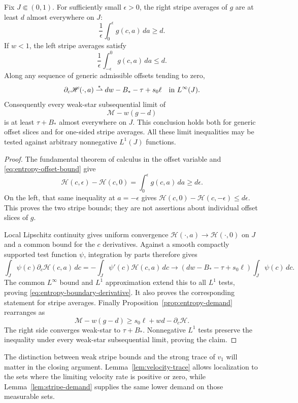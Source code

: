 \begin{lemma}
\label{lem:stripe-demand}
Fix $J\Subset(0,1)$.  For sufficiently small $\epsilon>0$, the right
stripe averages of $g$ are at least $d$ almost everywhere on $J$:
\begin{equation}
 \frac1\epsilon\int_0^\epsilon g(c,a)\,da\ge d.
 \label{eq:entropy-right-stripe}
\end{equation}
If $w<1$, the left stripe averages satisfy
\begin{equation}
 \frac1\epsilon\int_{-\epsilon}^0g(c,a)\,da\le d.
 \label{eq:entropy-left-stripe}
\end{equation}
Along any sequence of generic admissible offsets tending to zero,
\begin{equation}
 \partial_c\mathscr H(\cdot,a)
    \overset{*}{\rightharpoonup}dw-B_*-\tau+s_0\ell
           \quad\hbox{in }L^\infty(J).
 \label{eq:entropy-boundary-derivative}
\end{equation}
Consequently every weak-star subsequential limit of
\begin{equation}
 \mathcal M-w(g-d)
 \label{eq:entropy-adjusted-demand}
\end{equation}
is at least $\tau+B_*$ almost everywhere on $J$.  This conclusion
holds both for generic offset slices and for one-sided stripe averages.
All these limit inequalities may be tested against arbitrary
nonnegative $L^1(J)$ functions.
\end{lemma}

\begin{proof}
The fundamental theorem of calculus in the offset variable and
\eqref{eq:entropy-offset-bound} give
\[
 \mathscr H(c,\epsilon)-\mathscr H(c,0)
           =\int_0^\epsilon g(c,a)\,da\ge d\epsilon.
\]
On the left, that same inequality at $a=-\epsilon$ gives
$\mathscr H(c,0)-\mathscr H(c,-\epsilon)\le d\epsilon$.
This proves the two stripe bounds; they are not assertions about
individual offset slices of $g$.

Local Lipschitz continuity gives uniform convergence
$\mathscr H(\cdot,a)\to\mathscr H(\cdot,0)$ on $J$ and a common
bound for the $c$ derivatives.  Against a smooth compactly supported
test function $\psi$, integration by parts therefore gives
\[
 \int_J\psi(c)\partial_c\mathscr H(c,a)\,dc
 =-\int_J\psi'(c)\mathscr H(c,a)\,dc
 \longrightarrow
 (dw-B_*-\tau+s_0\ell)\int_J\psi(c)\,dc.
\]
The common $L^\infty$ bound and $L^1$ approximation extend this to
all $L^1$ tests, proving \eqref{eq:entropy-boundary-derivative}.
It also proves the corresponding statement for stripe averages.
Finally Proposition~\ref{prop:entropy-demand} rearranges as
\[
 \mathcal M-w(g-d)\ge s_0\ell+wd-\partial_c\mathscr H.
\]
The right side converges weak-star to $\tau+B_*$.  Nonnegative
$L^1$ tests preserve the inequality under every weak-star
subsequential limit, proving the claim.
\end{proof}

The distinction between weak stripe bounds and the strong trace of
$v_1$ will matter in the closing argument.  Lemma~\ref{lem:velocity-trace}
allows localization to the sets where the limiting velocity rate is
positive or zero, while Lemma~\ref{lem:stripe-demand} supplies the
same lower demand on those measurable sets.
